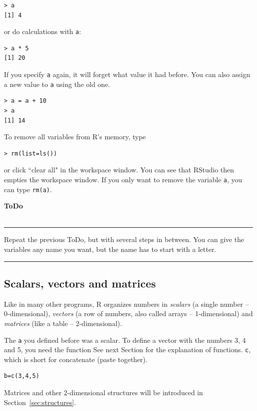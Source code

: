 \documentclass[a4paper,11pt,twocolumn,tablecaptionabove]{scrartcl}
\makeatletter
\newenvironment{ToDo} {%
  \begin{flushright}
    \hfill
    \begin{minipage}{0.95\columnwidth}         %
    \textsf{\textbf{ToDo}} \\
      \vspace{-0.85cm}\\
      {\color{Gray}\rule[-0.1cm]{\columnwidth}{1.5pt}}} { %
      {\color{Gray} \rule[0.3cm]{\columnwidth}{1.5pt}}
    \end{minipage}
    \vspace{1em}
  \end{flushright}
  }
\let\SF@@footnote\footnote
\def\footnote{\ifx\protect\@typeset@protect
 \expandafter\SF@@footnote
 \else
 \expandafter\SF@gobble@opt
 \fi
}
\edef\SF@gobble@opt{\noexpand\protect
 \expandafter\noexpand\csname SF@gobble@opt \endcsname}
\makeatother
\begin{document}
\begin{Verbatim}[frame=single,gobble=0]
> a 
[1] 4
\end{Verbatim}
or do calculations with \texttt{a}: 

\begin{Verbatim}[frame=single,gobble=0]
> a * 5
[1] 20
\end{Verbatim}

If you specify \texttt{a} again, it will forget what value it had before. You can also assign a new value to \texttt{a} using the old one.

\begin{Verbatim}[frame=single,gobble=0]
> a = a + 10
> a
[1] 14
\end{Verbatim}

To remove all variables from R's memory, type
\begin{Verbatim}[frame=single,gobble=0]
> rm(list=ls())
\end{Verbatim}
or click ``clear all" in the workspace window. You can see that RStudio then empties the workspace window. If you only want to remove the variable \texttt{a}, you can type \texttt{rm(a)}.

\begin{ToDo}
Repeat the previous ToDo, but with several steps in between. You can give the variables any name you want, but the name has to start with a letter. \\
\end{ToDo}

\subsection{Scalars, vectors and matrices}

Like in many other programs, R organizes numbers in \emph{scalars} (a single number -- 0-dimensional), \emph{vectors} (a row of numbers, also called arrays -- 1-dimensional) and \emph{matrices} (like a table -- 2-dimensional).

The \texttt{a} you defined before was a scalar. To define a vector with the numbers 3, 4 and 5, you need the function\footnote{See next Section for the explanation of functions.} \texttt{c}, which is short for concatenate (paste together). 
\begin{Verbatim}[frame=single,gobble=0]
b=c(3,4,5)
\end{Verbatim}

Matrices and other 2-dimensional structures will be introduced in Section~\ref{sec:structures}.
\end{document}
